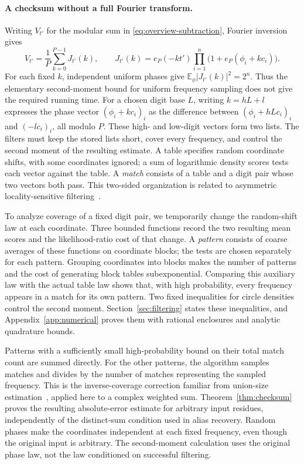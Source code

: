 \paragraph{A checksum without a full Fourier transform.}
Writing $V_{t'}$ for the modular sum in
\eqref{eq:overview-subtraction}, Fourier inversion gives
\[
 V_{t'}=\frac1P\sum_{k=0}^{P-1}J_{t'}(k),
 \qquad
 J_{t'}(k)=e_P(-kt')\prod_{i=1}^n
                         \bigl(1+e_P(\phi_i+kc_i)\bigr).
\]
For each fixed $k$, independent uniform phases give
$\mathbb E_\phi|J_{t'}(k)|^2=2^n$.  Thus the elementary second-moment
bound for uniform frequency sampling does not give the required
running time.
For a chosen digit base $L$, writing $k=hL+l$ expresses the phase
vector $(\phi_i+kc_i)_i$ as the difference between
$(\phi_i+hLc_i)_i$ and $(-lc_i)_i$, all modulo $P$.
These high- and low-digit vectors form two lists.  The filters must
keep the stored lists short, cover every frequency, and control the
second moment of the resulting estimate.  A table specifies
random coordinate shifts, with some coordinates ignored; a sum of
logarithmic density scores tests each vector against the table.
A \emph{match} consists of a table and a digit pair whose two vectors
both pass.  This two-sided organization is related to asymmetric
locality-sensitive filtering~\cite{Christiani2017}.

To analyze coverage of a fixed digit pair, we temporarily change the
random-shift law at each coordinate.  Three bounded functions record
the two resulting mean scores and the likelihood-ratio cost of that change.
A \emph{pattern} consists of coarse averages of these functions on
coordinate blocks; the tests are chosen separately for each pattern.
Grouping coordinates into blocks makes the number of patterns and the
cost of generating block tables subexponential.  Comparing this auxiliary
law with the actual table law shows that, with high probability, every
frequency appears in a match for its own pattern.
Two fixed inequalities for circle densities control the second
moment.  Section~\ref{sec:filtering} states these inequalities, and
Appendix~\ref{app:numerical} proves them with rational enclosures and
analytic quadrature bounds.

Patterns with a sufficiently small high-probability bound on their
total match count are summed directly.  For the other patterns, the
algorithm samples matches and
divides by the number of matches representing the sampled frequency.
This is the inverse-coverage correction familiar from union-size
estimation~\cite{KLM1989}, applied here to a complex weighted sum.
Theorem~\ref{thm:checksum} proves the resulting absolute-error estimate
for arbitrary input residues, independently of the distinct-sum
condition used in alias recovery.  Random phases make the coordinates
independent at each fixed frequency, even though the original input
is arbitrary.  The second-moment calculation uses the original phase
law, not the law conditioned on successful filtering.

